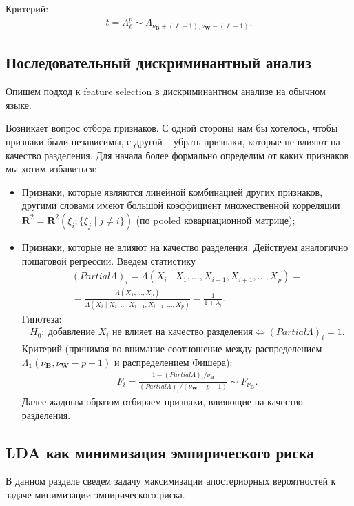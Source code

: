 \documentclass{article}
\begin{document}
Критерий:
\begin{align*}
t = \Lambda_{\ell}^{p} \sim \Lambda_{\nu_\mathbf{B} + (\ell - 1), \nu_\mathbf{W} - (\ell - 1)}.
\end{align*}

\subsection{Последовательный дискриминантный анализ}
Опишем подход к feature selection в дискриминантном анализе на обычном языке.

Возникает вопрос отбора признаков. С одной стороны нам бы хотелось, чтобы признаки были независимы, с другой -- убрать признаки, которые не влияют на качество разделения. Для начала более формально определим от каких признаков мы хотим избавиться:
\begin{itemize}
  \item Признаки, которые являются линейной комбинацией других признаков, другими словами имеют большой коэффициент множественной корреляции $\mathbf{R}^2 = \mathbf{R}^2(\xi_i;\{\xi_j \mid j \neq i\})$ (по pooled ковариационной матрице);
  \item Признаки, которые не влияют на качество разделения. Действуем аналогично пошаговой регрессии. Введем статистику
  \begin{multline*}
    (Partial \Lambda)_i = \Lambda(X_i \mid X_1, \ldots, X_{i - 1}, X_{i + 1}, \ldots, X_p) = \\
    = \frac{\Lambda(X_1, \ldots, X_p)}{\Lambda(X_i \mid X_1, \ldots, X_{i - 1}, X_{i + 1}, \ldots, X_p)} = \frac{1}{1 + \lambda_i}.
  \end{multline*}
  Гипотеза:
  \begin{align*}
    H_0 :~\text{добавление  $X_i$ не влияет на качество разделения} \Leftrightarrow (Partial \Lambda)_i = 1.
  \end{align*}
  Критерий (принимая во внимание соотношение между распределением $\Lambda_1(\nu_\mathbf{B}, \nu_\mathbf{W} - p + 1)$ и распределением Фишера):
  \begin{align*}
    F_i = \frac{1 - (Partial \Lambda)_i / \nu_\mathbf{B}}{(Partial \Lambda)_i/ (\nu_\mathbf{W} - p + 1)} \sim F_{\nu_\mathbf{B}}.
  \end{align*}
  Далее жадным образом отбираем признаки, влияющие на качество разделения.
\end{itemize}

\subsection{LDA как минимизация эмпирического риска}
В данном разделе сведем задачу максимизации апостериорных вероятностей к задаче минимизации эмпирического риска.
\end{document}
